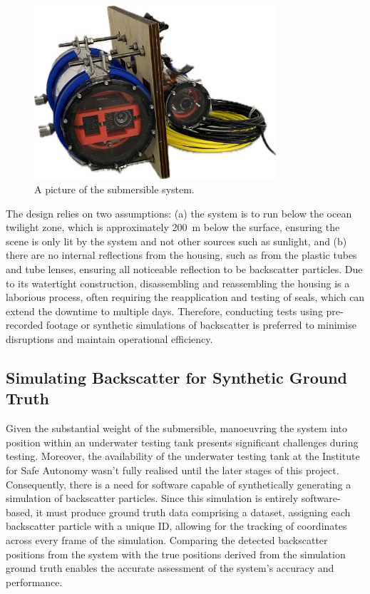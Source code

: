 \begin{figure}[H]
    \centering
    \includegraphics[width=0.8\textwidth]{assets/submersible.png}
    \caption{A picture of the submersible system.}
    \label{fig:submersible}
\end{figure}

The design relies on two assumptions: (a) the system is to run below the ocean twilight zone, which is approximately \SI{200}{\metre} below the surface, ensuring the scene is only lit by the system and not other sources such as sunlight, and (b) there are no internal reflections from the housing, such as from the plastic tubes and tube lenses, ensuring all noticeable reflection to be backscatter particles. Due to its watertight construction, disassembling and reassembling the housing is a laborious process, often requiring the reapplication and testing of seals, which can extend the downtime to multiple days. Therefore, conducting tests using pre-recorded footage or synthetic simulations of backscatter is preferred to minimise disruptions and maintain operational efficiency.

\subsection{Simulating Backscatter for Synthetic Ground Truth}
\label{designsim}

Given the substantial weight of the submersible, manoeuvring the system into position within an underwater testing tank presents significant challenges during testing. Moreover, the availability of the underwater testing tank at the Institute for Safe Autonomy wasn't fully realised until the later stages of this project. Consequently, there is a need for software capable of synthetically generating a simulation of backscatter particles. Since this simulation is entirely software-based, it must produce ground truth data comprising a dataset, assigning each backscatter particle with a unique ID, allowing for the tracking of coordinates across every frame of the simulation. Comparing the detected backscatter positions from the system with the true positions derived from the simulation ground truth enables the accurate assessment of the system's accuracy and performance.

